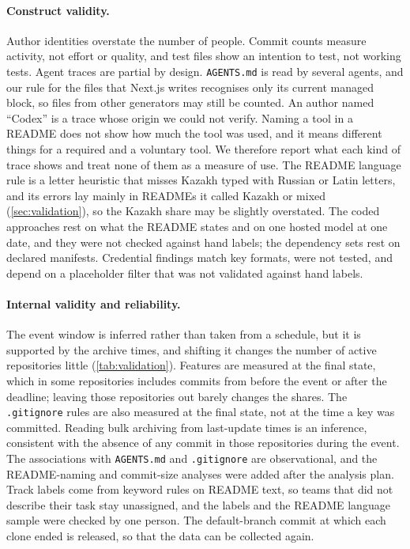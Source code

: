 \documentclass{article}
\begin{document}
\paragraph{Construct validity.} Author identities overstate the number of people. Commit counts measure activity, not effort or quality, and test files show an intention to test, not working tests. Agent traces are partial by design. \texttt{AGENTS.md} is read by several agents, and our rule for the files that Next.js writes recognises only its current managed block, so files from other generators may still be counted. An author named ``Codex'' is a trace whose origin we could not verify. Naming a tool in a README does not show how much the tool was used, and it means different things for a required and a voluntary tool. We therefore report what each kind of trace shows and treat none of them as a measure of use. The README language rule is a letter heuristic that misses Kazakh typed with Russian or Latin letters, and its errors lay mainly in READMEs it called Kazakh or mixed (\cref{sec:validation}), so the Kazakh share may be slightly overstated. The coded approaches rest on what the README states and on one hosted model at one date, and they were not checked against hand labels; the dependency sets rest on declared manifests. Credential findings match key formats, were not tested, and depend on a placeholder filter that was not validated against hand labels.

\paragraph{Internal validity and reliability.} The event window is inferred rather than taken from a schedule, but it is supported by the archive times, and shifting it changes the number of active repositories little (\cref{tab:validation}). Features are measured at the final state, which in some repositories includes commits from before the event or after the deadline; leaving those repositories out barely changes the shares. The \texttt{.gitignore} rules are also measured at the final state, not at the time a key was committed. Reading bulk archiving from last-update times is an inference, consistent with the absence of any commit in those repositories during the event. The associations with \texttt{AGENTS.md} and \texttt{.gitignore} are observational, and the README-naming and commit-size analyses were added after the analysis plan. Track labels come from keyword rules on README text, so teams that did not describe their task stay unassigned, and the labels and the README language sample were checked by one person. The default-branch commit at which each clone ended is released, so that the data can be collected again.
\end{document}
